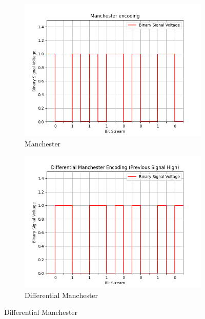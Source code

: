 \documentclass{article}
\begin{document}
\begin{figure}[H]
        \begin{subfigure}{0.49\textwidth}
            \centering
            \includegraphics[width=\linewidth]{manchester}
            \caption{Manchester}
        \end{subfigure}
        \hfill
        \begin{subfigure}{0.49\textwidth}
            \centering
            \includegraphics[width=\linewidth]{differential_manchester}
            \caption{Differential Manchester}
        \end{subfigure}

        \bigskip


\end{figure}
\end{document}
